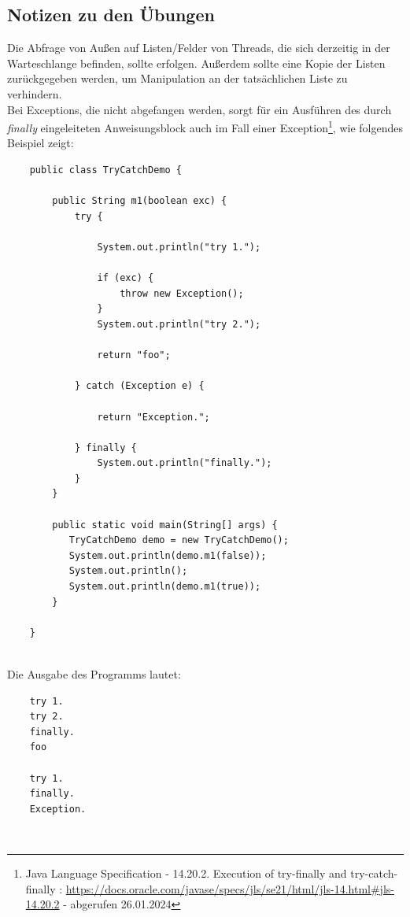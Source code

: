 \subsection{Notizen zu den Übungen}

Die Abfrage von Außen auf Listen/Felder von Threads, die sich derzeitig in der Warteschlange befinden, sollte  erfolgen.
Außerdem sollte eine Kopie der Listen zurückgegeben werden, um Manipulation an der tatsächlichen Liste zu verhindern.\\

\noindent
Bei Exceptions, die nicht abgefangen werden, sorgt  für ein Ausführen des durch \textit{finally} eingeleiteten Anweisungsblock auch im Fall einer Exception\footnote{
Java Language Specification - 14.20.2. Execution of try-finally and try-catch-finally : \url{https://docs.oracle.com/javase/specs/jls/se21/html/jls-14.html#jls-14.20.2} - abgerufen 26.01.2024
}, wie folgendes Beispiel zeigt:

\newpage
\begin{verbatim}
    public class TryCatchDemo {

        public String m1(boolean exc) {
            try {

                System.out.println("try 1.");

                if (exc) {
                    throw new Exception();
                }
                System.out.println("try 2.");

                return "foo";

            } catch (Exception e) {

                return "Exception.";

            } finally {
                System.out.println("finally.");
            }
        }

        public static void main(String[] args) {
           TryCatchDemo demo = new TryCatchDemo();
           System.out.println(demo.m1(false));
           System.out.println();
           System.out.println(demo.m1(true));
        }

    }
\end{verbatim}\\

Die Ausgabe des Programms lautet:


\noindent
\begin{verbatim}
    try 1.
    try 2.
    finally.
    foo

    try 1.
    finally.
    Exception.
\end{verbatim}\\



